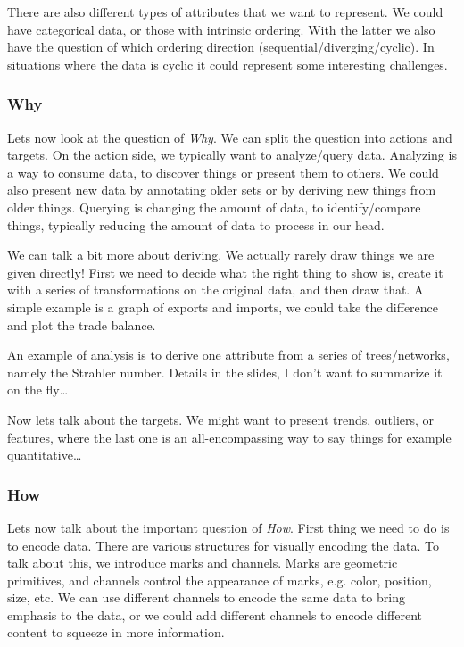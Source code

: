 \documentclass[letterpaper, 11pt]{article}
\numberwithin{equation}{section}
\numberwithin{figure}{section}
\begin{document}
There are also different types of attributes that we want to represent. We
could have categorical data, or those with intrinsic ordering. With the latter
we also have the question of which ordering direction
(sequential/diverging/cyclic). In situations where the data is cyclic it could
represent some interesting challenges.

\subsubsection{Why}

Lets now look at the question of \emph{Why}. We can split the question into
actions and targets. On the action side, we typically want to analyze/query
data. Analyzing is a way to consume data, to discover things or present them to
others. We could also present new data by annotating older sets or by deriving
new things from older things. Querying is changing the amount of data, to
identify/compare things, typically reducing the amount of data to process in our
head.

We can talk a bit more about deriving. We actually rarely draw things we are
given directly! First we need to decide what the right thing to show is, create
it with a series of transformations on the original data, and then draw that. A
simple example is a graph of exports and imports, we could take the difference
and plot the trade balance.

An example of analysis is to derive one attribute from a series of
trees/networks, namely the Strahler number. Details in the slides, I don't want
to summarize it on the fly\dots

Now lets talk about the targets. We might want to present trends, outliers, or
features, where the last one is an all-encompassing way to say things for
example quantitative\dots

\subsubsection{How}

Lets now talk about the important question of \emph{How}. First thing we need to
do is to encode data. There are various structures for visually encoding the
data. To talk about this, we introduce marks and channels. Marks are geometric
primitives, and channels control the appearance of marks, e.g. color, position,
size, etc. We can use different channels to encode the same data to bring
emphasis to the data, or we could add different channels to encode different
content to squeeze in more information.
\end{document}
